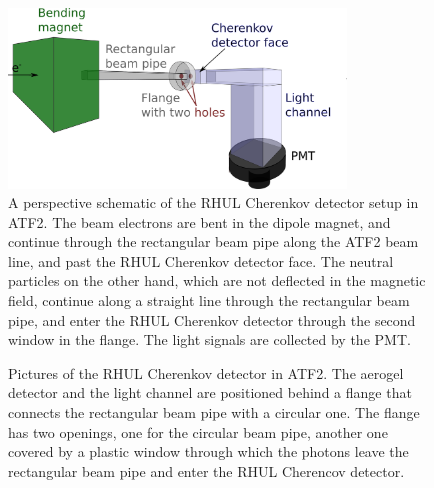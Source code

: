 \begin{figure}
\centering
\includegraphics[width=0.8\textwidth]{Figures/ATF/drawing_CherenkovSetup.png}
\caption[Schematic drawing of the RHUL Cherenkov detector setup]{A perspective schematic of the RHUL Cherenkov detector setup in ATF2.
The beam electrons are bent in the dipole magnet, and continue through the rectangular beam pipe along the ATF2 beam line, and past the RHUL Cherenkov detector face.
The neutral particles on the other hand, which are not deflected in the magnetic field, continue along a straight line through the rectangular beam pipe, and enter the RHUL Cherenkov detector through the second window in the flange. 
The light signals are collected by the PMT.}
\label{fig:RHUL_Cherenkov_Drawing}
\end{figure}

\begin{figure}
\begin{center}
\caption[Pictures of the RHUL Cherenkov detector]{Pictures of the RHUL Cherenkov detector in ATF2. 
The aerogel detector and the light channel are positioned behind a flange that connects the rectangular beam pipe with a circular one. 
The flange has two openings, one for the circular beam pipe, another one covered by a plastic window through which the photons leave the rectangular beam pipe and enter the RHUL Cherencov detector.}
\label{fig:RHUL_Cherenkov}
\end{center}
\end{figure}

